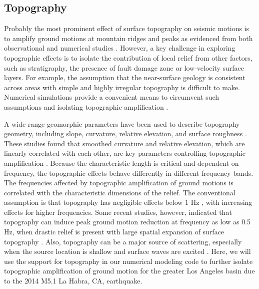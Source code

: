 \subsection{Topography}
Probably the most prominent effect of surface topography on seismic motions is to amplify ground motions at mountain ridges and peaks as evidenced from both observational and numerical studies \citep{celebiTopographicalGeologicalAmplifications1987,kawaseTopographyEffectCritical1990,massaExperimentalApproachEstimating2010,burjanekEmpiricalEvidenceLocal2014}. However, a key challenge in exploring topographic effects is to isolate the contribution of local relief from other factors, such as stratigraphy, the presence of fault damage zone or low-velocity surface layers. For example, the assumption that the near-surface geology is consistent across areas with simple and highly irregular topography  \citep{celebiTopographicalGeologicalAmplifications1987,geliEffectTopographyEarthquake1988,chavez-garciaComplexSiteEffects2000} is difficult to make. Numerical simulations provide a convenient means to circumvent such assumptions and isolating topographic ampliﬁcation \citep{booreNoteEffectSimple1972,sanchez-sesmaDiffractionSVRayleigh1991,lovati2011estimation,hartzellGroundMotionPresence2017}.

 A wide range geomorphic parameters have been used to describe topography geometry, including slope, curvature, relative elevation, and surface roughness \citep{ashfordAnalysisTopographicAmplification1997,nguyenEvaluationSeismicGround2007,bouckovalasNumericalEvaluationSlope2005}. These studies found that smoothed curvature and relative elevation, which are linearly correlated with each other, are key parameters controlling topographic amplification \citep{maufroyFrequencyScaledCurvature2015,raiEmpiricalTerrainBasedTopographic2017}. Because the characteristic length is critical and dependent on frequency, the topographic effects behave differently in different frequency bands. The frequencies affected by topographic amplification of ground motions is correlated with the characteristic dimensions of the relief. The conventional assumption is that topography has negligible effects below 1 Hz \citep{booreNoteEffectSimple1972, pischiuttaTopographicEffectsHill2010}, with increasing effects for higher frequencies. Some recent studies, however, indicated that topography can induce peak ground motion reduction at frequency as low as 0.5 Hz, when drastic relief is present with large spatial expansion of surface topography . Also, topography can be a major source of scattering, especially when the source location is shallow and surface waves are excited \citep{leeEffectsTopographySeismicWave2009, imperatoriRoleTopographyLateral2015}. Here, we will use the support for topography in our numerical modeling code to further isolate topographic amplification of ground motion for the greater Los Angeles basin due to the 2014 M5.1 La Habra, CA, earthquake.


